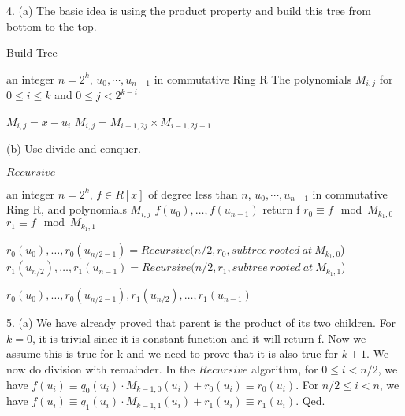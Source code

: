 \documentclass{article}
\begin{document}
\begin{itemize}
4. (a) The basic idea is using the product property and build this tree from bottom to the top.

\begin{algorithm}[H]  
    \caption{Build Tree}  
    \begin{algorithmic}[1]  
        \Require an integer $n = 2^k$, $u_0, \cdots, u_{n-1}$ in commutative Ring R
        \Ensure The polynomials $M_{i, j}$ for $0 \leq i \leq k$ and $0 \leq j<2^{k-i}$

            \State $M_{i,j} = x - u_i$
        \EndFor
            	\State $M_{i,j} = M_{i-1,2j}\times M_{i-1,2j+1}$
        	\EndFor
        \EndFor

    \end{algorithmic}  
\end{algorithm}

(b) Use divide and conquer.

\begin{algorithm}[H]  
    \caption{$Recursive$}  
    \begin{algorithmic}[1]  
        \Require an integer $n = 2^k$, $f \in R[x]$ of degree less than $n$, $u_0, \cdots, u_{n-1}$ in commutative Ring R, and polynomials $M_{i, j}$
        \Ensure $f\left(u_{0}\right), \ldots, f\left(u_{n-1}\right)$
        	\State return f
        \EndIf
        \State $r_0 \equiv f \mod M_{k_1, 0}$
		\State $r_1 \equiv f \mod M_{k_1, 1}$

		\State $r_{0}\left(u_{0}\right), \ldots, r_{0}\left(u_{n / 2-1}\right) =Recursive(n/2, r_0, subtree\ rooted\ at\ M_{k_1, 0}$)
		\State $r_{1}\left(u_{n / 2}\right), \ldots, r_{1}\left(u_{n-1}\right) =Recursive(n/2, r_1, subtree\ rooted\ at\ M_{k_1, 1}$)

        \State \Return $r_{0}\left(u_{0}\right), \ldots, r_{0}\left(u_{n / 2-1}\right), r_{1}\left(u_{n / 2}\right), \ldots, r_{1}\left(u_{n-1}\right)$

    \end{algorithmic}  
\end{algorithm}

5. (a) We have already proved that parent is the product of its two children. For $k = 0$, it is trivial since it is constant function and it will return f. Now we assume this is true for k and we need to prove that it is also true for $k+1$. We now do division with remainder. In the $Recursive$ algorithm, for $0\leq i < n/2$, we have $f(u_i) \equiv q_{0}\left(u_{i}\right) \cdot M_{k-1,0}\left(u_{i}\right)+r_{0}\left(u_{i}\right) \equiv r_{0}\left(u_{i}\right)$. For $n/2 \leq i < n$, we have $f(u_i) \equiv q_{1}\left(u_{i}\right) \cdot M_{k-1,1}\left(u_{i}\right)+r_{1}\left(u_{i}\right) \equiv r_{1}\left(u_{i}\right)$. Qed.


\end{itemize}
\end{document}
